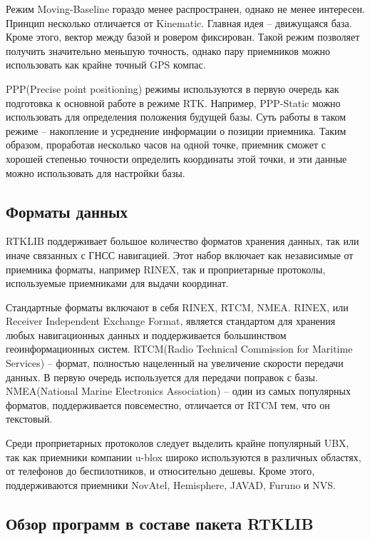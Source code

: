 Режим Moving-Baseline гораздо менее распространен, однако не менее интересен. Принцип несколько отличается от Kinematic. Главная идея – движущаяся база. Кроме этого, вектор между базой и ровером фиксирован. Такой режим позволяет получить значительно меньшую точность, однако пару приемников можно использовать как крайне точный GPS компас.

PPP(Precise point positioning) режимы используются в первую очередь как подготовка к основной работе в режиме RTK. Например, PPP-Static можно использовать для определения положения будущей базы. Суть работы в таком режиме – накопление и усреднение информации о позиции приемника. Таким образом, проработав несколько часов на одной точке, приемник сможет с хорошей степенью точности определить координаты этой точки, и эти данные можно использовать для настройки базы.

\subsection{Форматы данных} \label{subsect_1_2_3}

RTKLIB поддерживает большое количество форматов хранения данных, так или иначе связанных с ГНСС навигацией. Этот набор включает как независимые от приемника форматы, например RINEX, так и проприетарные протоколы, используемые приемниками для выдачи координат.

Стандартные форматы включают в себя RINEX, RTCM, NMEA. RINEX, или Receiver Independent Exchange Format, является стандартом для хранения любых навигационных данных и поддерживается большинством геоинформационных систем. RTCM(Radio Technical Commission for Maritime Services) – формат, полностью нацеленный на увеличение скорости передачи данных. В первую очередь используется для передачи поправок с базы. NMEA(National Marine Electronics Association) – один из самых популярных форматов, поддерживается повсеместно, отличается от RTCM тем, что он текстовый.

Среди проприетарных протоколов следует выделить крайне популярный UBX, так как приемники компании u-blox широко используются в различных областях, от телефонов до беспилотников, и относительно дешевы. Кроме этого, поддерживаются приемники NovAtel, Hemisphere, JAVAD, Furuno и NVS.

\subsection{Обзор программ в составе пакета RTKLIB} \label{subsect_1_2_4}

